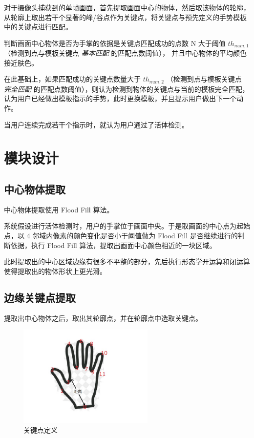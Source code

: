 \documentclass[UTF8, a4paper, fontset=none]{article}
\begin{document}
对于摄像头捕获到的单帧画面，首先提取画面中心的物体，然后取该物体的轮廓，从轮廓上取出若干个显著的峰/谷点作为关键点，将关键点与预先定义的手势模板中的关键点进行匹配。

判断画面中心物体是否为手掌的依据是关键点匹配成功的点数 N 大于阈值 $ th_{num, 1} $ （检测到点与模板关键点 \emph{基本匹配} 的匹配点数阈值）， 并且中心物体的平均颜色接近肤色。

在此基础上，如果匹配成功的关键点数量大于 $ th_{num, 2} $ （检测到点与模板关键点 \emph{完全匹配} 的匹配点数阈值），则认为检测到物体的关键点与当前的模板完全匹配，认为用户已经做出模板指示的手势，此时更换模板，并且提示用户做出下一个动作。

当用户连续完成若干个指示时，就认为用户通过了活体检测。

\section{模块设计}

\subsection{中心物体提取}

中心物体提取使用 Flood Fill 算法。

系统假设进行活体检测时，用户的手掌位于画面中央。于是取画面的中心点为起始点，以 4 邻域内像素的颜色变化是否小于阈值做为 Flood Fill 是否继续进行的判断依据，执行 Flood Fill 算法，提取出画面中心颜色相近的一块区域。

此时提取出的中心区域边缘有很多不平整的部分，先后执行形态学开运算和闭运算使得提取出的物体形状上更光滑。

\subsection{边缘关键点提取}

提取出中心物体之后，取出其轮廓点，并在轮廓点中选取关键点。

\begin{figure}
    \centering
    \includegraphics[width=0.6\textwidth]{./hand.jpg}
    \caption{关键点定义}
    \label{hand}
\end{figure}
\end{document}
